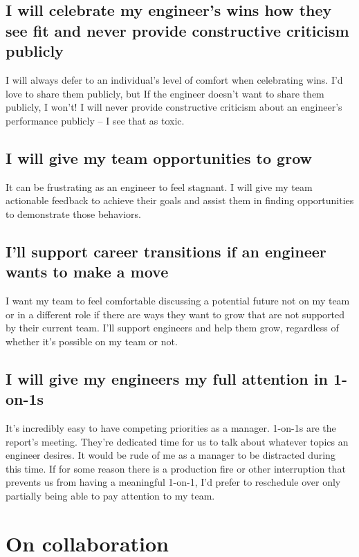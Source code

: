 \documentclass[11pt]{amsart}
\begin{document}
\subsection{I will celebrate my engineer's wins how they see fit and never provide constructive criticism publicly}
I will always defer to an individual's level of comfort when celebrating wins. I’d love to share them publicly, but If the engineer doesn't want to share them publicly, I won’t! I will never provide constructive criticism about an engineer's performance publicly – I see that as toxic.

\subsection{I will give my team opportunities to grow}
It can be frustrating as an engineer to feel stagnant. I will give my team actionable feedback to achieve their goals and assist them in finding opportunities to demonstrate those behaviors.

\subsection{I’ll support career transitions if an engineer wants to make a move}
I want my team to feel comfortable discussing a potential future not on my team or in a different role if there are ways they want to grow that are not supported by their current team. I’ll support engineers and help them grow, regardless of whether it’s possible on my team or not.

\subsection{I will give my engineers my full attention in 1-on-1s}
It’s incredibly easy to have competing priorities as a manager. 1-on-1s are the report's meeting. They’re dedicated time for us to talk about whatever topics an engineer desires. It would be rude of me as a manager to be distracted during this time. If for some reason there is a production fire or other interruption that prevents us from having a meaningful 1-on-1, I’d prefer to reschedule over only partially being able to pay attention to my team.


\section{On collaboration}
\end{document}
